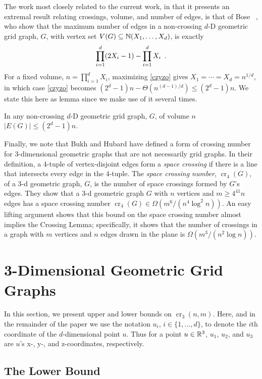 \documentclass{patmorin}
\DeclareMathOperator{\crs}{cr}
\begin{document}
The work most closely related to the current work, in that it presents
an extremal result relating crossings, volume, and number of edges, is
that of Bose \etal~\cite{bose.czyzowicz.ea:maximum}, who show that the
maximum number of edges in a non-crossing $d$-D geometric grid graph,
$G$, with vertex set $V(G)\subseteq \mathbb{N}(X_1,\ldots,X_d)$, is exactly
\begin{equation}
    \prod_{i=1}^d (2X_i-1) - \prod_{i=1}^d X_i \enspace . \eqlabel{czyzo}
\end{equation}
For a fixed volume, $n=\prod_{i=1}^d X_i$, maximizing \eqref{czyzo} gives
$X_1=\cdots=X_d=n^{1/d}$, in which case \eqref{czyzo} becomes $(2^d-1)n -
\Theta(n^{(d-1)/d})\le (2^d-1)n$.  We state this here as lemma since we
make use of it several times.
\begin{lem}
  In any non-crossing $d$-D geometric grid graph, $G$, of volume $n$
  $|E(G)|\le(2^d-1)n$.
\end{lem}

Finally, we note that Bukh and Hubard \cite{bukh.hubard:space} have
defined a form of crossing number for 3-dimensional geometric graphs
that are not necessarily grid graphs.  In their definition, a 4-tuple
of vertex-disjoint edges form a \emph{space crossing} if there is
a line that intersects every edge in the 4-tuple.  The \emph{space
crossing number}, $\crs_4(G)$, of a 3-d geometric graph, $G$, is the
number of space crossings formed by $G$'s edges.  They show that a
3-d geometric graph $G$ with $n$ vertices and $m\ge 4^{41}n$ edges
has a space crossing number $\crs_4(G) \in \Omega(m^6/(n^4\log^2 n))$.
An easy lifting argument shows that this bound on the space crossing
number almost implies the Crossing Lemma; specifically, it shows that
the number of crossings in a graph with $m$ vertices and $n$ edges drawn
in the plane is $\Omega(m^3/(n^2\log n))$.

\section{3-Dimensional Geometric Grid Graphs}

In this section, we present upper and lower bounds on $\crs_3(n,m)$.
Here, and in the remainder of the paper we use the notation
$u_i$, $i\in\{1,\ldots,d\}$, to denote the $i$th coordinate of the
$d$-dimensional point $u$.  Thus for a point $u\in\mathbb{R}^3$, $u_1$, $u_2$,
and $u_3$ are $u$'s x-, y-, and z-coordinates, respectively.

\subsection{The Lower Bound}
\end{document}
